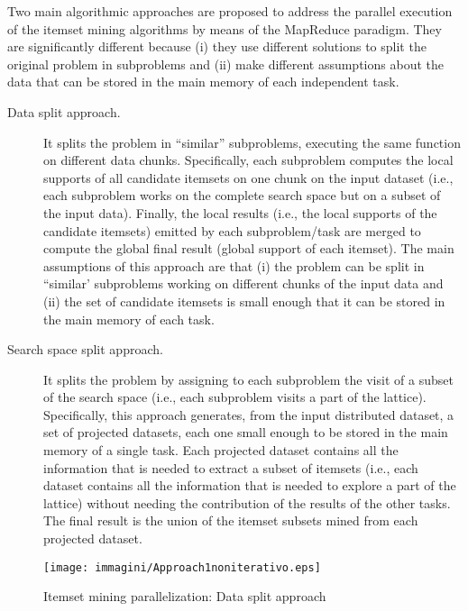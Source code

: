 Two main algorithmic approaches are proposed to address the parallel execution of the itemset mining algorithms by means of the MapReduce paradigm. 
They are significantly different because (i) they use different solutions to split the original problem in subproblems and (ii) make different assumptions about the data that can be stored in the main memory of each independent task. 

\begin{description}

\item[Data split approach.]  It splits the problem in ``similar'' subproblems, executing the same function on different data chunks. Specifically, each subproblem computes the local supports of all candidate itemsets on one chunk on the input dataset (i.e., each subproblem works on the complete search space but on a subset of the input data). Finally, the local results (i.e., the local supports of the candidate itemsets) emitted by each subproblem/task are merged to compute the global final result (global support of each itemset). The main assumptions of this approach are that (i) the problem can be split in ``similar' subproblems working on different chunks of the input data and (ii) the set of candidate itemsets is small enough that it can be stored in the main memory of each task.

\item[Search space split approach.]  It splits the problem by assigning to each subproblem the visit of a subset of the search space (i.e., each subproblem visits a part of the lattice). Specifically, this approach generates, from the input distributed dataset, a set of projected datasets, each one small enough to be stored in the main memory of a single task. Each projected dataset contains all the information that is needed to extract a subset of itemsets (i.e., each dataset contains all the information that is needed to explore a part of the lattice) without needing the contribution of the results of the other tasks. The final result is the union of the itemset subsets mined from each projected dataset.

\end{description}


\begin{figure}[!t]
\texttt{[image: immagini/Approach1noniterativo.eps]}
\caption{Itemset mining parallelization: Data split approach}
\label{approach1noniterativo}
\end{figure}

